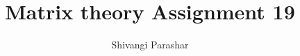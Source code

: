 \documentclass[journal,12pt,twocolumn]{IEEEtran}
\begin{document}
\makeatletter
{}
\makeatother
\let\StandardTheFigure\thefigure
\let\vec\mathbf
\renewcommand{\thefigure}{\theproblem}
\def\putbox#1#2#3{\makebox[0in][l]{\makebox[#1][l]{}\raisebox{\baselineskip}[0in][0in]{\raisebox{#2}[0in][0in]{#3}}}}
     \def\rightbox#1{\makebox[0in][r]{#1}}
     \def\centbox#1{\makebox[0in]{#1}}
     \def\topbox#1{\raisebox{-\baselineskip}[0in][0in]{#1}}
     \def\midbox#1{\raisebox{-0.5\baselineskip}[0in][0in]{#1}}
\vspace{3cm}
\title{Matrix theory Assignment 19}
\author{Shivangi Parashar}
%
%
%
% 
%
\end{document}
